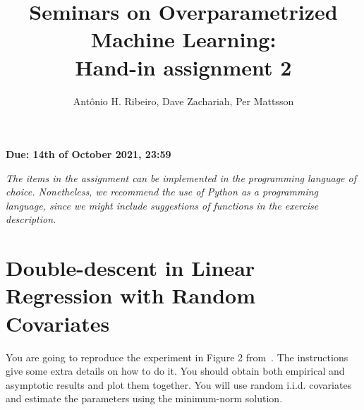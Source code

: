 \documentclass[a4paper,10pt]{article}
\title{Seminars on Overparametrized Machine Learning: \\Hand-in assignment 2}
\author{Antônio H. Ribeiro, Dave Zachariah, Per Mattsson}
\date{}
\newcounter{exercise}
\begin{document}
\maketitle
\vspace{6pt}
\begin{center}
	\large \textbf{Due: 14th  of October 2021, 23:59}
\end{center}

\textit{
The items in the assignment can be implemented in the programming language of choice.
Nonetheless, we recommend the use of Python as a programming language, since we might include suggestions of functions in the exercise description.}



\section*{Double-descent in Linear Regression with Random Covariates}


You are going to reproduce the experiment in Figure 2 from~\citep{hastie_surprises_2019}. The instructions give some extra details on how to do it. You should obtain both empirical and asymptotic results and plot them together. You will use random i.i.d. covariates and estimate the parameters using the minimum-norm solution.
\end{document}
